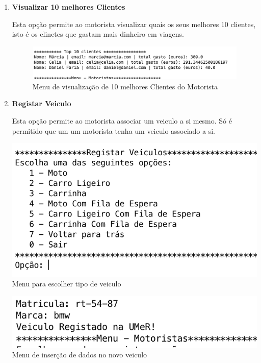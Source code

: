 \begin{enumerate}
\item \textbf{Visualizar 10 melhores Clientes}

Esta opção permite ao motorista visualizar quais os seus melhores 10 clientes, isto é os clinetes que gastam mais dinheiro em viagens. 

\begin{figure}[htpb]
	\centering
	\includegraphics[scale=0.6]{imagem/topClientesMotorista}
	\caption{Menu de visualização de 10 melhores Clientes do Motorista}
	\label{p3:fig:p3_topClientesMotorista}
\end{figure}



\item \textbf{Registar Veiculo}

Esta opção permite ao motorista associar um veiculo a si mesmo. Só é permitido que um um motorista tenha um veiculo associado a si. 

\noindent\begin{minipage}[b]{.4\textwidth}
	\includegraphics[scale=0.55]{imagem/escolherTipoVeiculo}
	\small{Menu para escolher tipo de veiculo}
\end{minipage} 
\hfill
\begin{minipage}[b]{.4\textwidth}
	\includegraphics[scale=0.5]{imagem/insercaoDadosVeiculo}
	\small{Menu de inserção de dados no novo veiculo}
\end{minipage}
\hfill



\end{enumerate}
